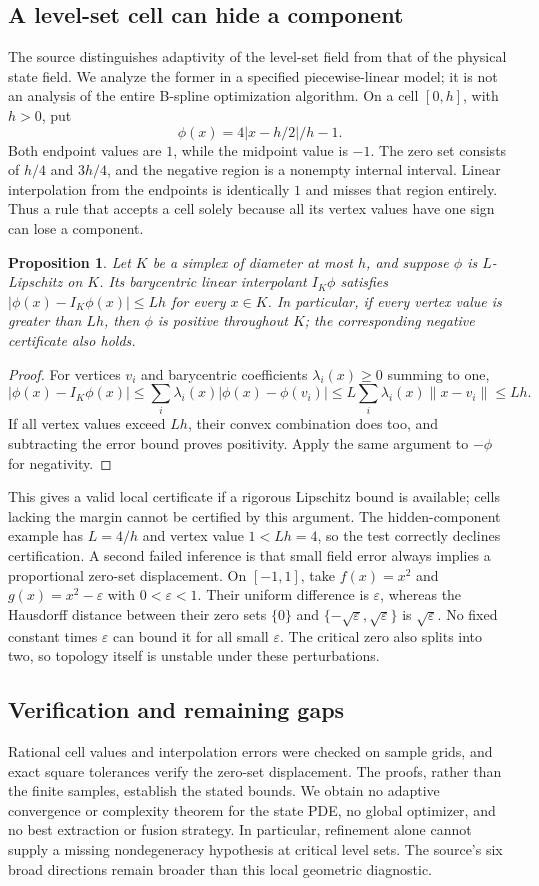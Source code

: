 \documentclass[11pt]{article}
\newtheorem{proposition}{Proposition}
\begin{document}
\subsection{A level-set cell can hide a component}
The source distinguishes adaptivity of the level-set field from that of the physical state field. We analyze the former in a specified piecewise-linear model; it is not an analysis of the entire B-spline optimization algorithm. On a cell $[0,h]$, with $h>0$, put
\[
\phi(x)=4|x-h/2|/h-1.
\]
Both endpoint values are $1$, while the midpoint value is $-1$. The zero set consists of $h/4$ and $3h/4$, and the negative region is a nonempty internal interval. Linear interpolation from the endpoints is identically $1$ and misses that region entirely. Thus a rule that accepts a cell solely because all its vertex values have one sign can lose a component.
\begin{proposition}
Let $K$ be a simplex of diameter at most $h$, and suppose $\phi$ is $L$-Lipschitz on $K$. Its barycentric linear interpolant $I_K\phi$ satisfies $|\phi(x)-I_K\phi(x)|\le Lh$ for every $x\in K$. In particular, if every vertex value is greater than $Lh$, then $\phi$ is positive throughout $K$; the corresponding negative certificate also holds.
\end{proposition}
\begin{proof}
For vertices $v_i$ and barycentric coefficients $\lambda_i(x)\ge0$ summing to one,
\[
|\phi(x)-I_K\phi(x)|
\le\sum_i\lambda_i(x)|\phi(x)-\phi(v_i)|
\le L\sum_i\lambda_i(x)\|x-v_i\|\le Lh.
\]
If all vertex values exceed $Lh$, their convex combination does too, and subtracting the error bound proves positivity. Apply the same argument to $-\phi$ for negativity.
\end{proof}
This gives a valid local certificate if a rigorous Lipschitz bound is available; cells lacking the margin cannot be certified by this argument. The hidden-component example has $L=4/h$ and vertex value $1<Lh=4$, so the test correctly declines certification.
A second failed inference is that small field error always implies a proportional zero-set displacement. On $[-1,1]$, take $f(x)=x^2$ and $g(x)=x^2-\varepsilon$ with $0<\varepsilon<1$. Their uniform difference is $\varepsilon$, whereas the Hausdorff distance between their zero sets $\{0\}$ and $\{-\sqrt\varepsilon,\sqrt\varepsilon\}$ is $\sqrt\varepsilon$. No fixed constant times $\varepsilon$ can bound it for all small $\varepsilon$. The critical zero also splits into two, so topology itself is unstable under these perturbations.
\subsection{Verification and remaining gaps}
Rational cell values and interpolation errors were checked on sample grids, and exact square tolerances verify the zero-set displacement. The proofs, rather than the finite samples, establish the stated bounds. We obtain no adaptive convergence or complexity theorem for the state PDE, no global optimizer, and no best extraction or fusion strategy. In particular, refinement alone cannot supply a missing nondegeneracy hypothesis at critical level sets. The source's six broad directions remain broader than this local geometric diagnostic.
\end{document}
